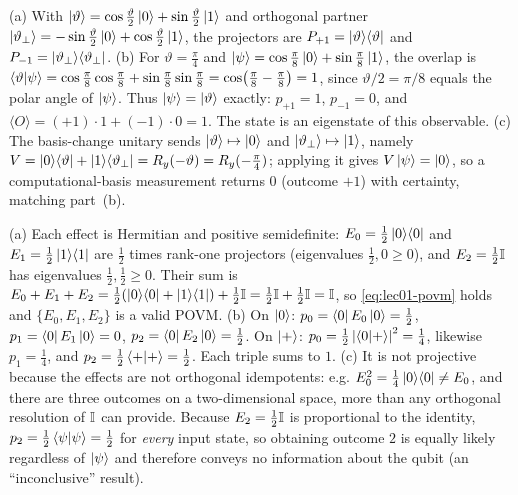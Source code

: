 \begin{solution}
(a) With $\ket{\vartheta}=\cos\tfrac{\vartheta}{2}\ket{0}+\sin\tfrac{\vartheta}{2}\ket{1}$
and orthogonal partner
$\ket{\vartheta_{\perp}}=-\sin\tfrac{\vartheta}{2}\ket{0}+\cos\tfrac{\vartheta}{2}\ket{1}$,
the projectors are $P_{+1}=\ket{\vartheta}\!\bra{\vartheta}$ and $P_{-1}=\ket{\vartheta_{\perp}}\!\bra{\vartheta_{\perp}}$.
(b) For $\vartheta=\tfrac{\pi}{4}$ and
$\ket{\psi}=\cos\tfrac{\pi}{8}\ket{0}+\sin\tfrac{\pi}{8}\ket{1}$, the overlap is
$\braket{\vartheta|\psi}=\cos\tfrac{\pi}{8}\cos\tfrac{\pi}{8}+\sin\tfrac{\pi}{8}\sin\tfrac{\pi}{8}
=\cos\bigl(\tfrac{\pi}{8}-\tfrac{\pi}{8}\bigr)=1$, since $\vartheta/2=\pi/8$ equals the
polar angle of $\ket{\psi}$. Thus $\ket{\psi}=\ket{\vartheta}$ exactly: $p_{+1}=1$,
$p_{-1}=0$, and $\langle O\rangle=(+1)\cdot1+(-1)\cdot0=1$. The state is an eigenstate
of this observable.
(c) The basis-change unitary sends $\ket{\vartheta}\mapsto\ket{0}$ and
$\ket{\vartheta_{\perp}}\mapsto\ket{1}$, namely
$V=\ket{0}\!\bra{\vartheta}+\ket{1}\!\bra{\vartheta_{\perp}}=R_{y}(-\vartheta)=R_{y}(-\tfrac{\pi}{4})$;
applying it gives $V\ket{\psi}=\ket{0}$, so a computational-basis measurement returns
$0$ (outcome $+1$) with certainty, matching part~(b).
\end{solution}

\begin{solution}
(a) Each effect is Hermitian and positive semidefinite: $E_{0}=\tfrac12\ket{0}\!\bra{0}$ and
$E_{1}=\tfrac12\ket{1}\!\bra{1}$ are $\tfrac12$ times rank-one projectors (eigenvalues
$\tfrac12,0\ge0$), and $E_{2}=\tfrac12\mathbb{I}$ has eigenvalues $\tfrac12,\tfrac12\ge0$.
Their sum is
$E_{0}+E_{1}+E_{2}=\tfrac12(\ket{0}\!\bra{0}+\ket{1}\!\bra{1})+\tfrac12\mathbb{I}=\tfrac12\mathbb{I}+\tfrac12\mathbb{I}=\mathbb{I}$,
so \eqref{eq:lec01-povm} holds and $\{E_{0},E_{1},E_{2}\}$ is a valid POVM.
(b) On $\ket{0}$: $p_{0}=\bra{0}E_{0}\ket{0}=\tfrac12$, $p_{1}=\bra{0}E_{1}\ket{0}=0$,
$p_{2}=\bra{0}E_{2}\ket{0}=\tfrac12$. On $\ket{+}$:
$p_{0}=\tfrac12\left\lvert \braket{0|+} \right\rvert^{2}=\tfrac14$, likewise $p_{1}=\tfrac14$, and
$p_{2}=\tfrac12\braket{+|+}=\tfrac12$. Each triple sums to $1$.
(c) It is not projective because the effects are not orthogonal idempotents: e.g.
$E_{0}^{2}=\tfrac14\ket{0}\!\bra{0}\neq E_{0}$, and there are three outcomes on a
two-dimensional space, more than any orthogonal resolution of $\mathbb{I}$ can provide.
Because $E_{2}=\tfrac12\mathbb{I}$ is proportional to the identity,
$p_{2}=\tfrac12\braket{\psi|\psi}=\tfrac12$ for \emph{every} input state, so obtaining
outcome $2$ is equally likely regardless of $\ket{\psi}$ and therefore conveys no
information about the qubit (an ``inconclusive'' result).
\end{solution}
